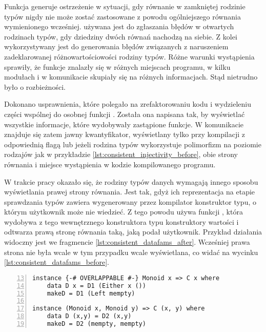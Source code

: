 Funkcja  generuje ostrzeżenie w sytuacji, gdy równanie
w zamkniętej rodzinie typów nigdy nie może zostać zastosowane z powodu ogólniejszego
równania wymienionego wcześniej.
 używana jest do zgłaszania błędów w otwartych rodzinach typów,
gdy dziedziny dwóch równań nachodzą na siebie.
Z kolei  wykorzystywany jest do generowania błędów związanych
z naruszeniem zadeklarowanej różnowartościowości rodziny typów.
Różne warunki wystąpienia sprawiły, że funkcje znalazły się w różnych miejscach
programu, w kilku modułach i w komunikacie skupiały się na różnych informacjach.
Stąd nietrudno było o rozbieżności.

Dokonano usprawnienia, które polegało na zrefaktorowaniu kodu i wydzieleniu
części wspólnej do osobnej funkcji . Została ona napisana tak, by wyświetlać wszystkie
informacje, które wydobywały zastąpione funkcje. W komunikacie znajduje się
zatem jawny kwantyfikator, wyświetlany tylko przy kompilacji z odpowiednią flagą
lub jeżeli rodzina typów wykorzystuje polimorfizm na poziomie rodzajów jak w
przykładzie \ref{lst:consistent_injectivity_before}, obie strony równania i
miejsce wystąpienia w kodzie kompilowanego programu.

W trakcie pracy okazało się, że rodziny typów danych wymagają innego sposobu
wyświetlania prawej strony równania. Jest tak, gdyż ich reprezentacja na etapie
sprawdzania typów zawiera wygenerowany przez kompilator konstruktor typu, o
którym użytkownik może nie wiedzieć. Z tego powodu  używa
funkcji , która wydobywa z tego wewnętrznego konstruktora typu
konstruktory wartości i odtwarza prawą stronę równania taką, jaką podał
użytkownik. Przykład działania widoczny jest we fragmencie
\ref{lst:consistent_datafams_after}. Wcześniej prawa strona nie była wcale w tym
przypadku wcale wyświetlana, co widać na wycinku
\ref{lst:consistent_datafams_before}.

\begin{lstlisting}[float,numbers=left,firstnumber=13,label={lst:consistent_datafams_code},
                   caption={Fragment testu T9371 z rodziną typów danych powiązaną z klasą \code{C} i równaniami o nachodzących na siebie dziedzinach.}]
instance {-# OVERLAPPABLE #-} Monoid x => C x where
    data D x = D1 (Either x ())
    makeD = D1 (Left mempty)

instance (Monoid x, Monoid y) => C (x, y) where
    data D (x,y) = D2 (x,y)
    makeD = D2 (mempty, mempty)
\end{lstlisting}

